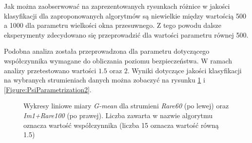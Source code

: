 \noindent Jak można zaobserwować na zaprezentowanych rysunkach różnice w jakości klasyfikacji dla zaproponowanych algorytmów są niewielkie między wartością 500 a 1000 dla parametru wielkości okna przesuwnego. Z tego powodu dalsze eksperymenty zdecydowano się przeprowadzić dla wartości parametru równej 500.

Podobna analiza została przeprowadzona dla parametru dotyczącego współczynnika wymagane do obliczania poziomu bezpieczeństwa. W ramach analizy przetestowano wartości $1.5$ oraz $2$. Wyniki dotyczące jakości klasyfikacji na wybranych strumieniach danych można zobaczyć na rysunku \ref{Figure:PsiParametrization1} i \ref{Figure:PsiParametrization2}.

\begin{figure}[h]
    \centering
    \qquad
    \caption{Wykresy liniowe miary \textit{G-mean} dla strumieni \textit{Rare60} (po lewej) oraz \textit{Im1+Rare100} (po prawej). Liczba zawarta w nazwie algorytmu oznacza wartość współczynnika (liczba 15 oznacza wartość równą 1.5)}\label{Figure:PsiParametrization1}
\end{figure}

\newpage

